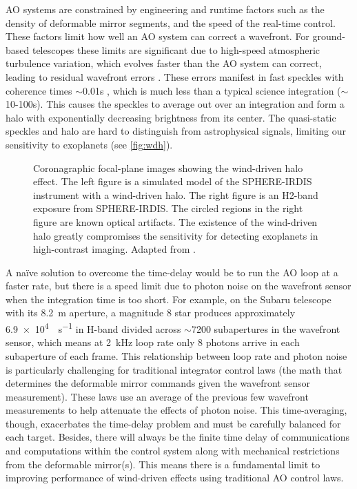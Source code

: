 AO systems are constrained by engineering and runtime factors such as the density of deformable mirror segments, and the speed of the real-time control. These factors limit how well an AO system can correct a wavefront. For ground-based telescopes these limits are significant due to high-speed atmospheric turbulence variation, which evolves faster than the AO system can correct, leading to residual wavefront errors \citep{Soummer_2007}. These errors manifest in fast speckles with coherence times $\sim$0.01s \citep{2018ARA&A..56..315G}, which is much less than a typical science integration ($\sim$10-100s). This causes the speckles to average out over an integration and form a halo with exponentially decreasing brightness from its center. The quasi-static speckles and halo are hard to distinguish from astrophysical signals, limiting our sensitivity to exoplanets (see \autoref{fig:wdh}).

\begin{figure}
    \centering
    \caption{Coronagraphic focal-plane images showing the wind-driven halo effect. The left figure is a simulated model of the SPHERE-IRDIS instrument with a wind-driven halo. The right figure is an H2-band exposure from SPHERE-IRDIS. The circled regions in the right figure are known optical artifacts. The existence of the wind-driven halo greatly compromises the sensitivity for detecting exoplanets in high-contrast imaging. Adapted from \cite{2020AA...638A..98C}.}
    \label{fig:wdh}
\end{figure}
A na\"ive solution to overcome the time-delay would be to run the AO loop at a faster rate, but there is a speed limit due to photon noise on the wavefront sensor when the integration time is too short. For example, on the Subaru telescope with its \SI{8.2}{\meter} aperture, a magnitude 8 star produces approximately \SI{6.9e4}{\photon\per\second} in H-band divided across $\sim$\num{7200} subapertures in the wavefront sensor, which means at \SI{2}{\kilo\hertz} loop rate only 8 photons arrive in each subaperture of each frame. This relationship between loop rate and photon noise is particularly challenging for traditional integrator control laws (the math that determines the deformable mirror commands given the wavefront sensor measurement). These laws use an average of the previous few wavefront measurements to help attenuate the effects of photon noise. This time-averaging, though, exacerbates the time-delay problem and must be carefully balanced for each target. Besides, there will always be the finite time delay of communications and computations within the control system along with mechanical restrictions from the deformable mirror(s). This means there is a fundamental limit to improving performance of wind-driven effects using traditional AO control laws.

